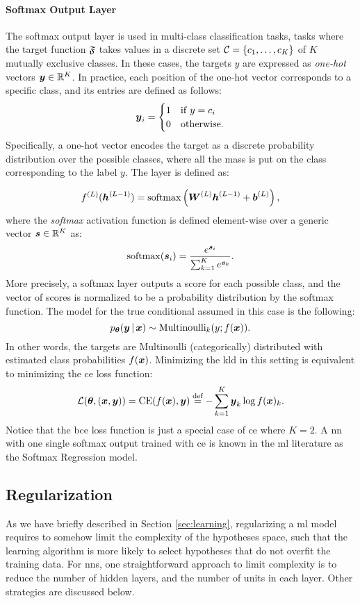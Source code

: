 \paragraph{Softmax Output Layer}
The softmax output layer is used in multi-class classification tasks, \ie tasks where the target function $\mathfrak{F}$ takes values in a discrete set $\Cal{C} = \Set{c_1, \ldots, c_K}$ of $K$ mutually exclusive classes. In these cases, the targets $y$ are expressed as \emph{one-hot} vectors $\Vector{y} \in \Real^K$. In practice, each position of the one-hot vector corresponds to a specific class, and its entries are defined as follows:
\begin{align*}
    \Vector{y}_i=
    \begin{cases}
        1 & \mathrm{if}\; y = c_i\\
        0 & \mathrm{otherwise}.
    \end{cases}
\end{align*}
Specifically, a one-hot vector encodes the target as a discrete probability distribution over the possible classes, where all the mass is put on the class corresponding to the label $y$. The layer is defined as:

$$\Layer{f}{L}(\LayerVector{h}{L-1}) = \softmax \Par{\LayerMatrix{W}{L} \LayerVector{h}{L-1} + \LayerVector{b}{L}},$$
where the \emph{softmax} activation function is defined element-wise over a generic vector $\Vector{s} \in \Real^K$ as:
$$\softmax(\Vector{s}_i) = \frac{e^{\Vector{s}_i}}{\sum_{k=1}^K e^{\Vector{s}_k}}.$$
More precisely, a softmax layer outputs a score for each possible class, and the vector of scores is normalized to be a probability distribution by the softmax function. The model for the true conditional assumed in this case is the following:
$$p_{\Param}(\Vector{y} \given \Vector{x}) \sim \Fun{Multinoulli}_k(y; f(\Vector{x})).$$
In other words, the targets are Multinoulli (categorically) distributed with estimated class probabilities $f(\Vector{x})$. Minimizing the \gls{kld} in this setting is equivalent to minimizing the \gls{ce} loss function:
$$\Loss(\Param, (\Vector{x}, \Vector{y})) = \mathrm{CE}(f(\Vector{x}), \Vector{y}) \defeq - \sum_{k=1}^K \Vector{y}_k \log f(\Vector{x})_k.$$
Notice that the \gls{bce} loss function is just a special case of \gls{ce} where $K = 2$. A \gls{nn} with one single softmax output trained with \gls{ce} is known in the \gls{ml} literature as the Softmax Regression model.

\subsection{Regularization}\label{sec:regularization}
As we have briefly described in Section \ref{sec:learning}, regularizing a \gls{ml} model requires to somehow limit the complexity of the hypotheses space, such that the learning algorithm is more likely to select hypotheses that do not overfit the training data. For \glspl{nn}, one straightforward approach to limit complexity is to reduce the number of hidden layers, and the number of units in each layer. Other strategies are discussed below.

